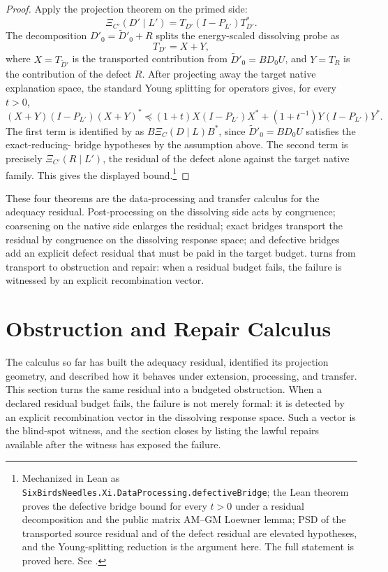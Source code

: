 \documentclass[11pt]{article}
\newcommand{\preceqq}{\preceq}
\theoremstyle{definition}
\begin{document}
\begin{proof}
Apply the projection theorem on the primed side:
\[
  \Xi_{C'}(D'\mid L')=T_{D'}(I-P_{L'})T_{D'}^*.
\]
The decomposition \(D'_0 = \widetilde D'_0 + R\) splits the
energy-scaled dissolving probe as
\[
  T_{D'}=X+Y,
\]
where \(X=T_{\widetilde D'}\) is the transported contribution
from \(\widetilde D'_0=BD_0U\), and \(Y=T_R\) is the contribution
of the defect \(R\).  After projecting away the target native
explanation space, the standard Young splitting for operators
\citep{BhatiaDavis1995CauchySchwarz,Ando1995MatrixYoung} gives, for every
\(t>0\),
\[
  (X+Y)(I-P_{L'})(X+Y)^*
  \preceqq
  (1+t)X(I-P_{L'})X^*
  +(1+t^{-1})Y(I-P_{L'})Y^*.
\]
The first term is identified by
 as \(B\Xi_C(D\mid L)B^*\),
since \(\widetilde D'_0=BD_0U\) satisfies the exact-reducing-
bridge hypotheses by the assumption above.  The second term is
precisely \(\Xi_{C'}(R\mid L')\), the residual of the defect
alone against the target native family.  This gives the
displayed bound.\footnote{Mechanized in Lean as \texttt{SixBirdsNeedles.Xi.DataProcessing.defectiveBridge}; the Lean theorem proves the defective bridge bound for every \(t>0\) under a residual decomposition and the public matrix AM--GM Loewner lemma; PSD of the transported source residual and of the defect residual are elevated hypotheses, and the Young-splitting reduction is the argument here.  The full statement is proved here.  See .}
\end{proof}

These four theorems are the data-processing and transfer calculus for the
adequacy residual.  Post-processing on the dissolving side acts by congruence;
coarsening on the native side enlarges the residual; exact bridges transport
the residual by congruence on the dissolving response space; and defective
bridges add an explicit defect residual that must be paid in the target budget.
 turns from transport to obstruction and repair: when a
residual budget fails, the failure is witnessed by an explicit recombination
vector.
 \section{Obstruction and Repair Calculus}
\label{sec:blind-spot}

The calculus so far has built the adequacy residual, identified its projection
geometry, and described how it behaves under extension, processing, and
transfer.  This section turns the same residual into a budgeted obstruction.
When a declared residual budget fails, the failure is not merely formal: it is
detected by an explicit recombination vector in the dissolving response space.
Such a vector is the blind-spot witness, and the section closes by listing the
lawful repairs available after the witness has exposed the failure.
\end{document}
